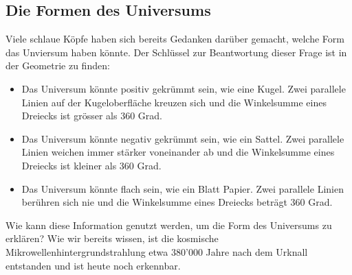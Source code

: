 	\subsection{Die Formen des Universums}
	Viele schlaue Köpfe haben sich bereits Gedanken darüber gemacht, welche Form das Unviersum haben könnte. Der Schlüssel zur Beantwortung dieser Frage ist in der Geometrie zu finden:
	\begin{itemize}
		\item Das Universum könnte positiv gekrümmt sein, wie eine Kugel.
		Zwei parallele Linien auf der Kugeloberfläche kreuzen sich und die Winkelsumme eines Dreiecks ist grösser als 360 Grad.
		\item Das Universum könnte negativ gekrümmt sein, wie ein Sattel.
		Zwei parallele Linien weichen immer stärker voneinander ab und die Winkelsumme eines Dreiecks ist kleiner als 360 Grad.
		\item Das Universum könnte flach sein, wie ein Blatt Papier.
		Zwei parallele Linien berühren sich nie und die Winkelsumme eines Dreiecks beträgt 360 Grad.
	\end{itemize}
	Wie kann diese Information genutzt werden, um die Form des Universums zu erklären?
	Wie wir bereits wissen, ist die kosmische Mikrowellenhintergrundstrahlung etwa 380'000 Jahre nach dem Urknall entstanden und ist heute noch erkennbar. 
	
	
	
